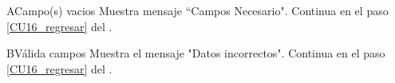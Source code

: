 \begin{UCtrayectoriaA}{A}{Campo(s) vacios}
\UCpaso Muestra mensaje “Campos Necesario".
\UCpaso Continua en el paso \ref{CU16_regresar} del .
\end{UCtrayectoriaA}

\begin{UCtrayectoriaA}{B}{Válida campos}
\UCpaso Muestra el mensaje "Datos incorrectos".
\UCpaso Continua en el paso \ref{CU16_regresar} del .
\end{UCtrayectoriaA}


	


